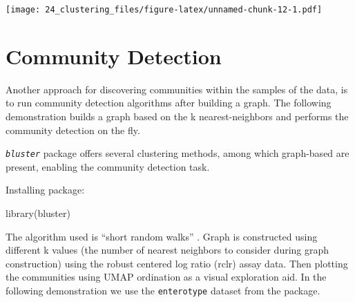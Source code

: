 \documentclass[
]{book}
\newenvironment{Shaded}{\begin{snugshade}}{\end{snugshade}}
\newcommand{\FunctionTok}[1]{\textcolor[rgb]{0.00,0.00,0.00}{#1}}
\newcommand{\NormalTok}[1]{#1}
\begin{document}
\texttt{[image: 24\_clustering\_files/figure-latex/unnamed-chunk-12-1.pdf]}

\hypertarget{community-detection}{%
\section{Community Detection}\label{community-detection}}

Another approach for discovering communities within the samples of the
data, is to run community detection algorithms after building a
graph. The following demonstration builds a graph based on the k
nearest-neighbors and performs the community detection on the fly.

\emph{\texttt{bluster}} \citep{R_bluster} package offers several clustering methods,
among which graph-based are present, enabling the community detection
task.

Installing package:

\begin{Shaded}
\begin{Highlighting}[]
\FunctionTok{library}\NormalTok{(bluster)}
\end{Highlighting}
\end{Shaded}

The algorithm used is ``short random walks'' \citep{Pons2006}. Graph is
constructed using different k values (the number of nearest neighbors
to consider during graph construction) using the robust centered log
ratio (rclr) assay data. Then plotting the communities using UMAP
\citep{McInnes2018} ordination as a visual exploration aid. In the
following demonstration we use the \texttt{enterotype} dataset from the
\citep{R_mia} package.
\end{document}
